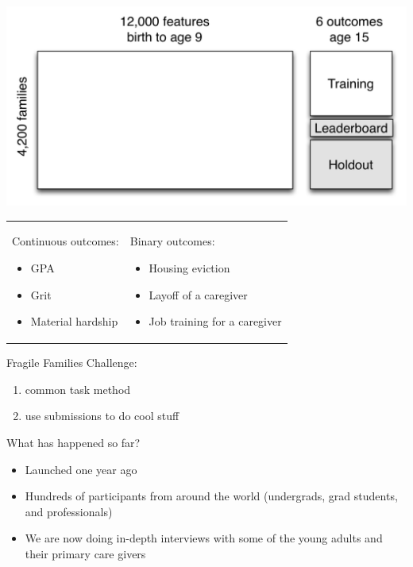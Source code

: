 \documentclass{beamer}
\begin{document}
\begin{frame}

\begin{center}
\includegraphics[width=\textwidth]{figures/ffc_design_matrix_ml}
\end{center}

\end{frame}
\begin{frame}

\begin{tabular}{p{}p{}}
Continuous outcomes:
\begin{itemize}
\item GPA
\item Grit
\item Material hardship
\end{itemize}
&
Binary outcomes:
\begin{itemize}
\item Housing eviction
\item Layoff of a caregiver
\item Job training for a caregiver
\end{itemize}
\end{tabular}

\end{frame}
\begin{frame}

Fragile Families Challenge:
\begin{enumerate}
\item common task method
\pause
\item use submissions to do cool stuff
\end{enumerate}

\end{frame}
\begin{frame}

What has happened so far?\\ \pause
\begin{itemize}
\item Launched one year ago \pause
\item Hundreds of participants from around the world (undergrads, grad students, and professionals) \pause
\item We are now doing in-depth interviews with some of the young adults and their primary care givers
\end{itemize}

\end{frame}
\end{document}
